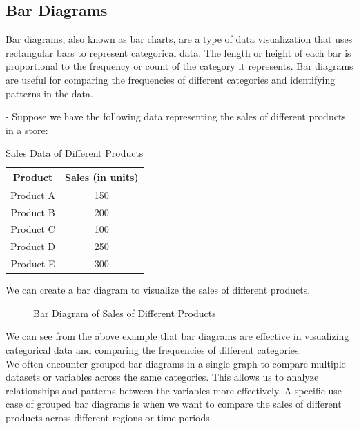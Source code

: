 \documentclass[openany]{book}
\begin{document}
\subsection{Bar Diagrams}
Bar diagrams, also known as bar charts, are a type of data visualization that uses rectangular bars to represent categorical data. The length or height of each bar is proportional to the frequency or count of the category it represents. Bar diagrams are useful for comparing the frequencies of different categories and identifying patterns in the data. \\
\begin{example}
 - Suppose we have the following data representing the sales of different products in a store:
\begin{table}[H]
    \centering
    \begin{tabular}{|c|c|}
        \hline
        \textbf{Product} & \textbf{Sales (in units)} \\
        \hline
        Product A & 150 \\
        Product B & 200 \\
        Product C & 100 \\
        Product D & 250 \\
        Product E & 300 \\
        \hline
    \end{tabular}
    \caption{Sales Data of Different Products}
\end{table}
We can create a bar diagram to visualize the sales of different products. \\
\begin{figure}[H]
    \centering
    \caption{Bar Diagram of Sales of Different Products}
\end{figure}
\end{example}
We can see from the above example that bar diagrams are effective in visualizing categorical data and comparing the frequencies of different categories. \\
We often encounter grouped bar diagrams in a single graph to compare multiple datasets or variables across the same categories. This allows us to analyze relationships and patterns between the variables more effectively. A specific use case of grouped bar diagrams is when we want to compare the sales of different products across different regions or time periods.
\end{document}
